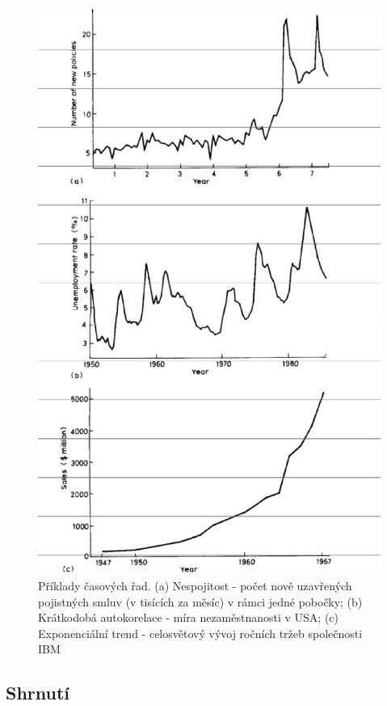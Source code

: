 \begin{figure}[htp]
\centering
\includegraphics[scale = 0.55]{pictures/figure_5_1.eps}
\caption{Příklady časových řad. (a) Nespojitost - počet nově uzavřených pojistných smluv (v tisících za měsíc) v rámci jedné pobočky; (b) Krátkodobá autokorelace - míra nezaměstnanosti v USA; (c) Exponenciální trend - celosvětový vývoj ročních tržeb společnosti IBM}
\label{figure_5_1}
\end{figure}

\subsection{Shrnutí}


